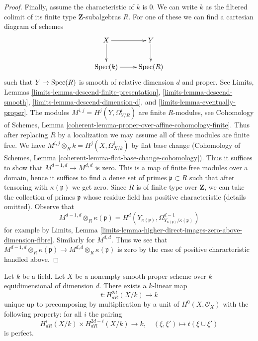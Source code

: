 \begin{proof}
\medskip\noindent
Finally, assume the characteristic of $k$ is $0$.
We can write $k$ as the filtered colimit of its finite type
$\mathbf{Z}$-subalgebras $R$. For one of these we can find a
cartesian diagram of schemes
$$
\xymatrix{
X \ar[d] \ar[r] & Y \ar[d] \\
\Spec(k) \ar[r] & \Spec(R)
}
$$
such that $Y \to \mathop{\mathrm{Spec}}(R)$ is smooth of relative dimension $d$ and proper.
See Limits, Lemmas \ref{limits-lemma-descend-finite-presentation},
\ref{limits-lemma-descend-smooth}, \ref{limits-lemma-descend-dimension-d}, and
\ref{limits-lemma-eventually-proper}.
The modules $M^{i, j} = H^j(Y, \Omega^i_{Y/R})$ are finite $R$-modules, see
Cohomology of Schemes, Lemma
\ref{coherent-lemma-proper-over-affine-cohomology-finite}.
Thus after replacing $R$ by a localization we may assume all of these
modules are finite free. We have
$M^{i, j} \otimes_R k = H^j(X, \Omega^i_{X/k})$
by flat base change (Cohomology of Schemes, Lemma
\ref{coherent-lemma-flat-base-change-cohomology}).
Thus it suffices to show that $M^{d - 1, d} \to M^{d, d}$
is zero. This is a map of finite free modules over a domain,
hence it suffices to find a dense set of primes $\mathfrak p \subset R$
such that after tensoring with $\kappa(\mathfrak p)$ we get zero.
Since $R$ is of finite type over $\mathbf{Z}$, we can take
the collection of primes $\mathfrak p$ whose residue field
has positive characteristic (details omitted). Observe that
$$
M^{d - 1, d} \otimes_R \kappa(\mathfrak p) =
H^d(Y_{\kappa(\mathfrak p)},
\Omega^{d - 1}_{Y_{\kappa(\mathfrak p)}/\kappa(\mathfrak p)})
$$
for example by Limits, Lemma
\ref{limits-lemma-higher-direct-images-zero-above-dimension-fibre}.
Similarly for $M^{d, d}$. Thus we see that
$M^{d - 1, d} \otimes_R \kappa(\mathfrak p) \to
M^{d, d} \otimes_R \kappa(\mathfrak p)$
is zero by the case of positive characteristic handled above.
\end{proof}

\begin{proposition}
\label{proposition-poincare-duality}
Let $k$ be a field. Let $X$ be a nonempty smooth proper scheme over $k$
equidimensional of dimension $d$. There exists a $k$-linear map
$$
t : H^{2d}_{dR}(X/k) \longrightarrow k
$$
unique up to precomposing by multiplication by a unit of
$H^0(X, \mathcal{O}_X)$ with the following property: for all $i$ the pairing
$$
H^i_{dR}(X/k) \times H_{dR}^{2d - i}(X/k)
\longrightarrow
k, \quad
(\xi, \xi') \longmapsto t(\xi \cup \xi')
$$
is perfect.
\end{proposition}

